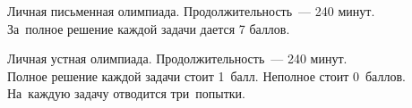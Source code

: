 Личная письменная олимпиада.  Продолжительность~--- 240 минут.\\
За~полное решение каждой задачи дается 7 баллов.

Личная устная олимпиада.  Продолжительность~--- 240 минут.\\
Полное решение каждой задачи стоит 1~балл.
Неполное стоит 0~баллов.\\
На~каждую задачу отводится три~попытки.


